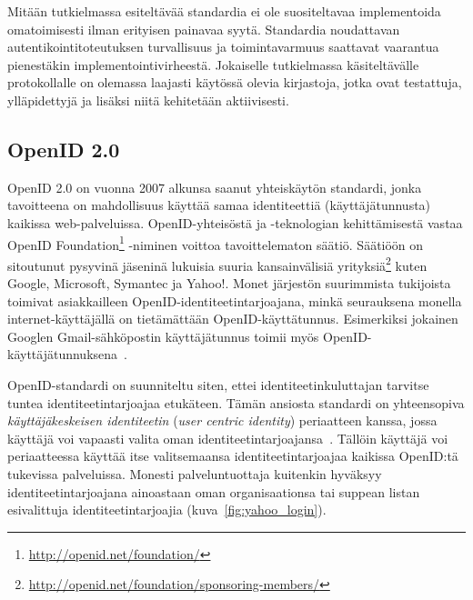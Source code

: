 \documentclass[finnish,gradu]{tktltiki}
\begin{document}
  Mitään tutkielmassa esiteltävää standardia ei ole suositeltavaa implementoida omatoimisesti ilman erityisen painavaa syytä. Standardia noudattavan autentikointitoteutuksen turvallisuus ja toimintavarmuus saattavat vaarantua pienestäkin implementointivirheestä. Jokaiselle tutkielmassa käsiteltävälle protokollalle on olemassa laajasti käytössä olevia kirjastoja, jotka ovat testattuja, ylläpidettyjä ja lisäksi niitä kehitetään aktiivisesti.




  \subsection{OpenID 2.0} %
  \label{sub:openid}


  OpenID 2.0 on vuonna 2007 alkunsa saanut yhteiskäytön standardi, jonka tavoitteena on mahdollisuus käyttää samaa identiteettiä (käyttäjätunnusta) kaikissa web-palveluissa. OpenID-yhteisöstä ja -teknologian kehittämisestä vastaa OpenID Foundation\footnote{\url{http://openid.net/foundation/}} -niminen voittoa tavoittelematon säätiö. Säätiöön on sitoutunut pysyvinä jäseninä lukuisia suuria kansainvälisiä yrityksiä\footnote{\url{http://openid.net/foundation/sponsoring-members/}} kuten Google, Microsoft, Symantec ja Yahoo!. Monet järjestön suurimmista tukijoista toimivat asiakkailleen OpenID-identiteetintarjoajana, minkä seurauksena monella internet-käyttäjällä on tietämättään OpenID-käyttätunnus. Esimerkiksi jokainen Googlen Gmail-sähköpostin käyttäjätunnus toimii myös OpenID-käyttäjätunnuksena~\cite{google_openid_dev_docs}.

  OpenID-standardi on suunniteltu siten, ettei identiteetinkuluttajan tarvitse tuntea identiteetintarjoajaa etukäteen. Tämän ansiosta standardi on yhteensopiva \emph{käyttäjäkeskeisen identiteetin} (\emph{user centric identity}) periaatteen kanssa, jossa käyttäjä voi vapaasti valita oman identiteetintarjoajansa~\cite{openid_recordon_2009}. Tällöin käyttäjä voi periaatteessa käyttää itse valitsemaansa identiteetintarjoajaa kaikissa OpenID:tä tukevissa palveluissa.
  Monesti palveluntuottaja kuitenkin hyväksyy identiteetintarjoajana ainoastaan oman organisaationsa tai suppean listan esivalittuja identiteetintarjoajia (kuva~\ref{fig:yahoo_login}).
\end{document}
